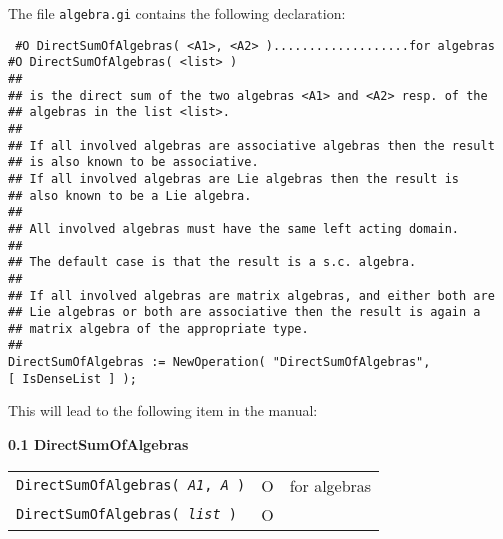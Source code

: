 \documentclass[a4wide]{article}
\begin{document}
\begin{exa}
The file {\tt algebra.gi} contains the following declaration:\par
\vspace{2mm}\par
{\tt \noindent 
\#O  DirectSumOfAlgebras( <A1>, <A2> )...................for algebras\\
\#O  DirectSumOfAlgebras( <list> )\\
\#\#\\
\#\#  is the direct sum of the two algebras <A1> and <A2> resp. of the \\
\#\#  algebras in the list <list>.\\
\#\#\\
\#\#  If all involved algebras are associative algebras then the result \\
\#\#  is also known to be associative.\\
\#\#  If all involved algebras are Lie algebras then the result is \\
\#\#  also known to be a Lie algebra.\\
\#\#\\
\#\#  All involved algebras must have the same left acting domain.\\
\#\#\\
\#\#  The default case is that the result is a s.c. algebra.\\
\#\#\\
\#\#  If all involved algebras are matrix algebras, and either both are\\
\#\#  Lie algebras or both are associative then the result is again a\\
\#\#  matrix algebra of the appropriate type.\\
\#\#\\
DirectSumOfAlgebras := NewOperation( "DirectSumOfAlgebras",\\
    {}[ IsDenseList ] );
}\par
\vspace{2mm}\par
This will lead to the following item in the manual:\par
\vspace{2mm}
{\noindent \bf \large 0.1 DirectSumOfAlgebras}
\vspace{2mm}\par
\begin{tabular}{llr}
{\tt DirectSumOfAlgebras( {\it A1}, {\it A} )} & O & for algebras\\
{\tt DirectSumOfAlgebras( {\it list} )} & O & \\
\end{tabular}
\vspace{3mm}



\end{exa}
\end{document}
